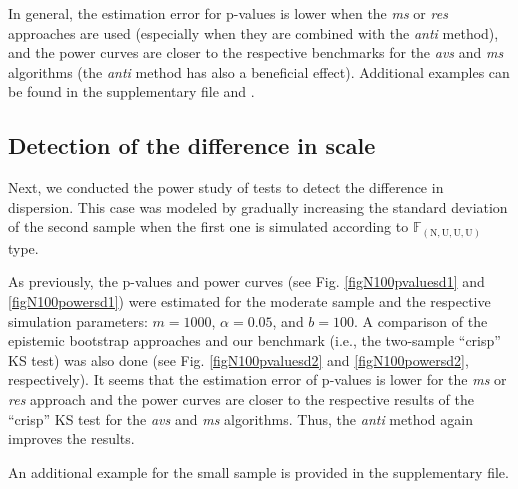 In general, the estimation error for p-values is lower when the \emph{ms} or \emph{res} approaches are used (especially when they are combined with the \emph{anti} method), and the power curves are closer to the respective benchmarks for the \emph{avs} and \emph{ms} algorithms (the \emph{anti} method has also a beneficial effect).
Additional examples can be found in the supplementary file and \cite{10.1007/978-3-031-08974-9_39}.




\subsection{Detection of the difference in scale}

Next, we conducted the power study of tests to detect the difference in dispersion.
This case was modeled by gradually increasing the standard deviation of the second sample when the first one is simulated according to $\mathbb{F}_{(\mathrm{N,U,U,U})}$ type.

As previously, the p-values and power curves (see Fig. \ref{figN100pvaluesd1} and \ref{figN100powersd1}) were estimated for the moderate sample and the respective simulation parameters: $m=1000$, $\alpha=0.05$, and $b=100$.
A comparison of the epistemic bootstrap approaches and our benchmark (i.e., the two-sample ``crisp'' KS test) was also done (see Fig. \ref{figN100pvaluesd2} and \ref{figN100powersd2}, respectively).
It seems that the estimation error of p-values is lower for the \emph{ms} or \emph{res} approach and the power curves are closer to the respective results of the ``crisp'' KS test for the \emph{avs} and \emph{ms} algorithms. Thus, the \emph{anti} method again improves the results.

An additional example for the small sample is provided in the supplementary file.


